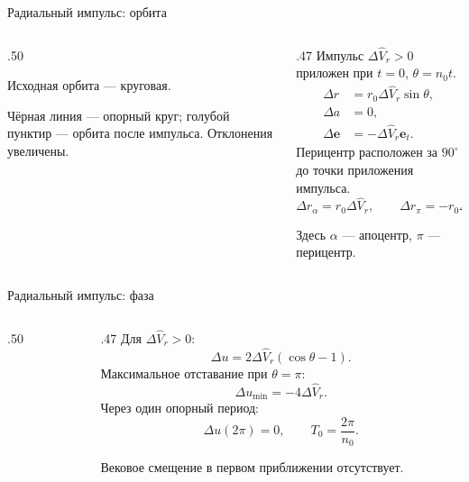 \documentclass[11pt,aspectratio=169,t]{beamer}
\newcommand{\eqcompact}{\fontsize{10}{12}\selectfont}
\newcommand{\figcaption}[1]{{\usebeamerfont{caption}\color{coursemuted}#1\par}}
\begin{document}
\begin{frame}{Радиальный импульс: орбита}
\relax
\begin{columns}[T,onlytextwidth]
\begin{column}{.50\textwidth}
{\justifying
Исходная орбита — круговая.\par}
\smallskip
\centering
\figcaption{Чёрная линия --- опорный круг; голубой пунктир --- орбита после импульса. Отклонения увеличены.}
\end{column}
\begin{column}{.47\textwidth}
Импульс $\Delta\widehat V_r>0$ приложен при $t=0$, $\theta=n_0t$.
{\eqcompact
\setlength{\abovedisplayskip}{3pt}\setlength{\belowdisplayskip}{3pt}
\setlength{\abovedisplayshortskip}{2pt}\setlength{\belowdisplayshortskip}{2pt}
\[
 \begin{aligned}
 \Delta r&=r_0{\Delta\widehat V_r}\sin\theta,\\
 \Delta a&=0,\\
 \Delta\boldsymbol e&=-{\Delta\widehat V_r}\boldsymbol e_t.
 \end{aligned}
\]
}
Перицентр расположен за $90^\circ$ до точки приложения импульса.
{\eqcompact
\setlength{\abovedisplayskip}{3pt}\setlength{\belowdisplayskip}{3pt}
\setlength{\abovedisplayshortskip}{2pt}\setlength{\belowdisplayshortskip}{2pt}
\[
 \Delta r_\alpha=r_0{\Delta\widehat V_r},\qquad \Delta r_\pi=-r_0{\Delta\widehat V_r}.
\]
}
{\justifying
Здесь $\alpha$ --- апоцентр, $\pi$ --- перицентр.\par}
\end{column}
\end{columns}
\end{frame}

\begin{frame}{Радиальный импульс: фаза}
\relax
\begin{columns}[T,onlytextwidth]
\begin{column}{.50\textwidth}
\centering
\end{column}
\begin{column}{.47\textwidth}
Для $\Delta\widehat V_r>0$:
{\eqcompact
\setlength{\abovedisplayskip}{3pt}\setlength{\belowdisplayskip}{3pt}
\setlength{\abovedisplayshortskip}{2pt}\setlength{\belowdisplayshortskip}{2pt}
\[
 \Delta u=2{\Delta\widehat V_r}(\cos\theta-1).
\]
}
Максимальное отставание при $\theta=\pi$:
{\eqcompact
\setlength{\abovedisplayskip}{3pt}\setlength{\belowdisplayskip}{3pt}
\setlength{\abovedisplayshortskip}{2pt}\setlength{\belowdisplayshortskip}{2pt}
\[
 \Delta u_{\min}=-4\Delta\widehat V_r.
\]
}
Через один опорный период:
{\eqcompact
\setlength{\abovedisplayskip}{3pt}\setlength{\belowdisplayskip}{3pt}
\setlength{\abovedisplayshortskip}{2pt}\setlength{\belowdisplayshortskip}{2pt}
\[
 \Delta u(2\pi)=0,\qquad T_0=\frac{2\pi}{n_0}.
\]
}
{\justifying
Вековое смещение в первом приближении отсутствует.\par}
\end{column}
\end{columns}
\end{frame}
\end{document}
